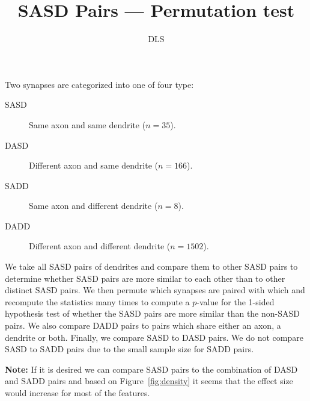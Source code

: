 \documentclass[12pt]{article}
\title{SASD Pairs --- Permutation test}
\author{DLS}
\theoremstyle{definition}
\begin{document}
\maketitle

Two synapses are categorized into one of four type:
\begin{description}
  \item[SASD] Same axon and same dendrite ($n=35$).
  \item[DASD] Different axon and same dendrite ($n=166$).
  \item[SADD] Same axon and different dendrite ($n=8$).
  \item[DADD] Different axon and different dendrite ($n=1502$). 
\end{description}

We take all SASD pairs of dendrites and compare them to other SASD pairs to determine whether SASD pairs are more similar to each other than to other distinct SASD pairs.
We then permute which synapses are paired with which and recompute the statistics many times to compute a $p$-value for the 1-sided hypothesis test of whether the SASD pairs are more similar than the non-SASD pairs.
We also compare DADD pairs to pairs which share either an axon, a dendrite or both. 
Finally, we compare SASD to DASD pairs.
We do not compare SASD to SADD pairs due to the small sample size for SADD pairs. 

\textbf{Note:} If it is desired we can compare SASD pairs to the combination of DASD and SADD pairs and based on Figure~\ref{fig:density} it seems that the effect size would increase for most of the features. 
\end{document}
